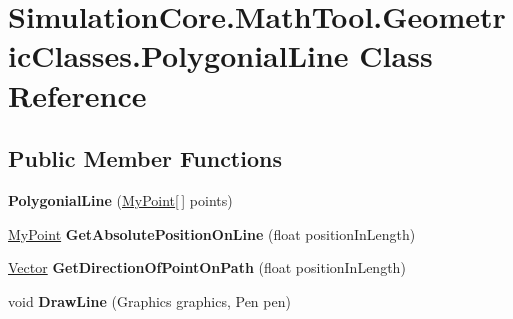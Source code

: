 \hypertarget{class_simulation_core_1_1_math_tool_1_1_geometric_classes_1_1_polygonial_line}{}\section{Simulation\+Core.\+Math\+Tool.\+Geometric\+Classes.\+Polygonial\+Line Class Reference}
\label{class_simulation_core_1_1_math_tool_1_1_geometric_classes_1_1_polygonial_line}
\subsection*{Public Member Functions}
\begin{DoxyCompactItemize}
\item 
{\bfseries Polygonial\+Line} (\hyperlink{class_simulation_core_1_1_math_tool_1_1_geometric_classes_1_1_my_point}{My\+Point}\mbox{[}$\,$\mbox{]} points)\hypertarget{class_simulation_core_1_1_math_tool_1_1_geometric_classes_1_1_polygonial_line_ac8ea3fc075a52e54ce05a2cb3dc45dcb}{}\label{class_simulation_core_1_1_math_tool_1_1_geometric_classes_1_1_polygonial_line_ac8ea3fc075a52e54ce05a2cb3dc45dcb}

\item 
\hyperlink{class_simulation_core_1_1_math_tool_1_1_geometric_classes_1_1_my_point}{My\+Point} {\bfseries Get\+Absolute\+Position\+On\+Line} (float position\+In\+Length)\hypertarget{class_simulation_core_1_1_math_tool_1_1_geometric_classes_1_1_polygonial_line_a7cac4468983f95a461304bab309116bf}{}\label{class_simulation_core_1_1_math_tool_1_1_geometric_classes_1_1_polygonial_line_a7cac4468983f95a461304bab309116bf}

\item 
\hyperlink{class_simulation_core_1_1_math_tool_1_1_geometric_classes_1_1_vector}{Vector} {\bfseries Get\+Direction\+Of\+Point\+On\+Path} (float position\+In\+Length)\hypertarget{class_simulation_core_1_1_math_tool_1_1_geometric_classes_1_1_polygonial_line_a097895f3acd682d8b61f34ee12ef1c34}{}\label{class_simulation_core_1_1_math_tool_1_1_geometric_classes_1_1_polygonial_line_a097895f3acd682d8b61f34ee12ef1c34}

\item 
void {\bfseries Draw\+Line} (Graphics graphics, Pen pen)\hypertarget{class_simulation_core_1_1_math_tool_1_1_geometric_classes_1_1_polygonial_line_a5020e8e484e918f7694bfa02a6420530}{}\label{class_simulation_core_1_1_math_tool_1_1_geometric_classes_1_1_polygonial_line_a5020e8e484e918f7694bfa02a6420530}

\end{DoxyCompactItemize}
